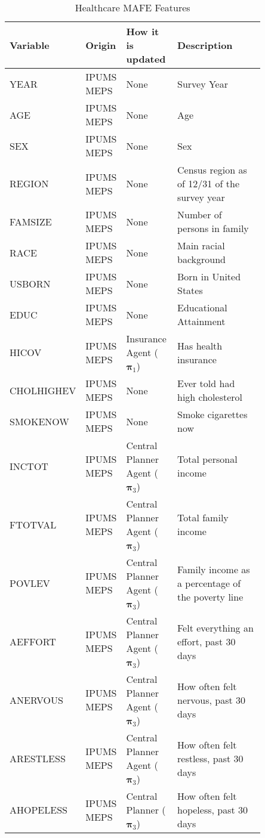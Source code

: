 \begin{table*}[ht!]
\caption{Healthcare MAFE Features}
\label{tab::Healthcare_indicators}
\centering
\begin{tabular}{ p{0.15\linewidth} || p{0.15\linewidth} || p{0.20\linewidth} || p{0.35\linewidth}}
 \hline
 Variable & Origin & How it is updated & Description\\
 \hline
 YEAR & IPUMS MEPS& None& Survey Year\\ 
 \hline
 AGE & IPUMS MEPS& None& Age\\ 
 \hline
 SEX & IPUMS MEPS& None& Sex\\ 
 \hline
 REGION & IPUMS MEPS& None& Census region as of 12/31 of the survey year\\ 
 \hline
 FAMSIZE & IPUMS MEPS& None& Number of persons in family\\ 
 \hline
 RACE & IPUMS MEPS& None& Main racial background\\  
  \hline
 USBORN & IPUMS MEPS& None& Born in United States\\  
 \hline
 EDUC & IPUMS MEPS& None& Educational Attainment\\
 \hline
 HICOV & IPUMS MEPS& Insurance Agent ($\boldsymbol{\pi}_1$) & Has health insurance\\ 
 \hline
 CHOLHIGHEV & IPUMS MEPS& None& Ever told had high cholesterol\\ 
 \hline
 SMOKENOW & IPUMS MEPS& None& Smoke cigarettes now\\ 
\hline
 INCTOT & IPUMS MEPS& Central Planner Agent ($\boldsymbol{\pi}_3$) & Total personal income\\
 \hline
 FTOTVAL & IPUMS MEPS& Central Planner Agent ($\boldsymbol{\pi}_3$) & Total family income\\
 \hline
 POVLEV & IPUMS MEPS& Central Planner Agent ($\boldsymbol{\pi}_3$) & Family income as a percentage of the poverty line\\
\hline
 AEFFORT & IPUMS MEPS& Central Planner Agent ($\boldsymbol{\pi}_3$) & Felt everything an effort, past 30 days\\
 \hline
 ANERVOUS & IPUMS MEPS& Central Planner Agent ($\boldsymbol{\pi}_3$) & How often felt nervous, past 30 days\\
 \hline
 ARESTLESS & IPUMS MEPS& Central Planner Agent ($\boldsymbol{\pi}_3$) & How often felt restless, past 30 days\\
 \hline
 AHOPELESS & IPUMS MEPS& Central Planner ($\boldsymbol{\pi}_3$) & How often felt hopeless, past 30 days\\
 \hline

\end{tabular}
\end{table*}
